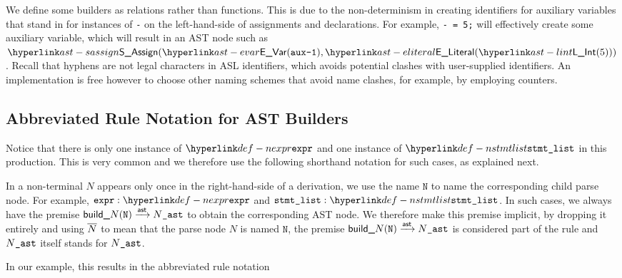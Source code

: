 We define some builders as relations rather than functions. This is due to the non-determinism
in creating identifiers for auxiliary variables that stand in for instances of \texttt{-} on the left-hand-side
of assignments and declarations.
For example, \texttt{- = 5;} will effectively create some auxiliary variable, which will result in
an AST node such as $\SAssign(\EVar(\texttt{aux-1}), \ELiteral(\lint(5)))$.
Recall that hyphens are not legal characters in ASL identifiers, which avoids potential clashes with
user-supplied identifiers. An implementation is free however to choose other naming schemes that
avoid name clashes, for example, by employing counters.

\subsection{Abbreviated Rule Notation for AST Builders}
Notice that there is only one instance of $\Nexpr$ and one instance of $\Nstmtlist$ in this production.
This is very common and we therefore use the following shorthand notation for such cases, as explained next.

In a non-terminal $N$ appears only once in the right-hand-side of a derivation,
we use the name $\texttt{N}$ to name the corresponding child parse node.
For example, $\namednode{\vexpr}{\Nexpr}$ and $\namednode{\vstmtlist}{\Nstmtlist}$.
In such cases, we always have the premise $\textsf{build\_}N(\texttt{N}) \astarrow \astversion{N}$
to obtain the corresponding AST node.
We therefore make this premise implicit, by dropping it entirely and using $\astof{N}$ to mean that
the parse node $N$ is named $\texttt{N}$, the premise $\textsf{build\_}N(\texttt{N}) \astarrow \astversion{N}$
is considered part of the rule and $\astversion{N}$ itself stands for $\astversion{N}$.

In our example, this results in the abbreviated rule notation
\begin{mathpar}
\end{mathpar}

